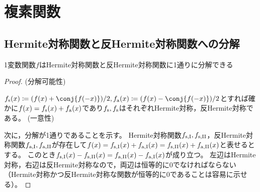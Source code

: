 \chapter{複素関数}
    \section{Hermite対称関数と反Hermite対称関数への分解}
        \label{decomp_into_Hermite_sym_and_anti_Hermite_sym_fxns}
        \begin{shadebox}
            1変数関数$f$はHermite対称関数と反Hermite対称関数に1通りに分解できる
        \end{shadebox}
            \begin{proof}
                (分解可能性)
                \par
                $\fs(x) \coloneq (f(x)+\conj{f(-x)})/2,\fa(x) \coloneq (f(x)-\conj{f(-x)})/2$とすれば確かに$f(x)=f_\mathrm{s}(x)+f_\mathrm{a}(x)$であり$f_\mathrm{s},f_\mathrm{s}$はそれぞれHermite対称，反Hermite対称である。
                \newline
                (一意性)
                \par
                次に，分解が1通りであることを示す。
                Hermite対称関数$f_\mathrm{s,I},f_\mathrm{s,II}$，反Hermite対称関数$f_\mathrm{a,I},f_\mathrm{a,II}$が存在して$f(x) = f_\mathrm{s,I}(x) + f_\mathrm{a,I}(x) = f_\mathrm{s,II}(x) + f_\mathrm{a,II}(x)$と表せるとする。
                このとき$f_\mathrm{s,I}(x) - f_\mathrm{s,II}(x) = f_\mathrm{a,II}(x) - f_\mathrm{a,I}(x)$が成り立つ。
                左辺はHermite対称，右辺は反Hermite対称なので，両辺は恒等的に0でなければならない（Hermite対称かつ反Hermite対称な関数が恒等的に0であることは容易に示せる）。
            \end{proof}